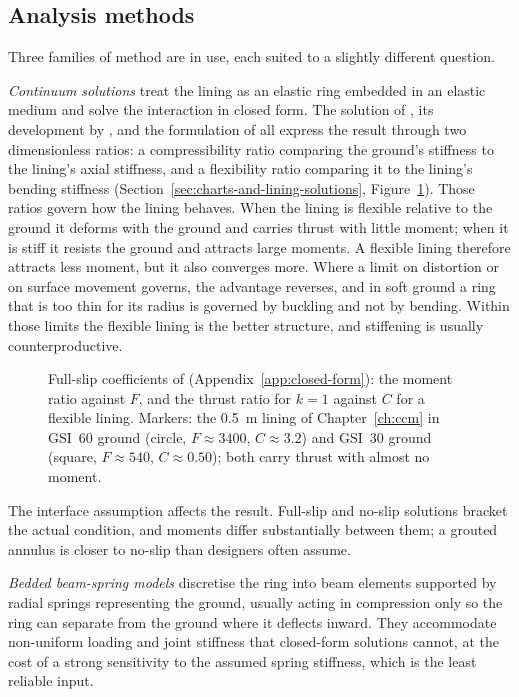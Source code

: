 \subsection{Analysis methods}
\label{sec:lining-analysis}

Three families of method are in use, each suited to a slightly different
question.

\emph{Continuum solutions} treat the lining as an elastic ring embedded in an
elastic medium and solve the interaction in closed form. The solution of \citet{muirwood1975},
its development by \citet{duddeck1985structural}, and the formulation of
\citet{einstein1979simplified}
all express the result through two dimensionless ratios: a
compressibility ratio comparing the ground's stiffness to the lining's axial
stiffness, and a flexibility ratio comparing it to the lining's bending
stiffness (Section~\ref{sec:charts-and-lining-solutions},
Figure~\ref{fig:lining-ratios}). Those ratios govern
how the lining behaves. When the
lining is flexible relative to the ground it deforms with the ground and
carries thrust with little moment; when it is stiff it resists the ground and
attracts large moments. A flexible lining therefore attracts less moment, but
it also converges more. Where a limit on distortion or on surface movement
governs, the advantage reverses, and in soft ground a ring that is too thin
for its radius is governed by buckling and not by bending. Within those
limits the flexible lining is the better structure, and stiffening is
usually counterproductive.

\begin{figure}[htbp]
\centering
{}
\caption{Full-slip coefficients of \citet{einstein1979simplified} (Appendix~\ref{app:closed-form}): the moment ratio against $F$, and the thrust ratio for $k = 1$ against $C$ for a flexible lining. Markers: the 0.5~m lining of Chapter~\ref{ch:ccm} in GSI~60 ground (circle, $F \approx 3400$, $C \approx 3.2$) and GSI~30 ground (square, $F \approx 540$, $C \approx 0.50$); both carry thrust with almost no moment.}
\label{fig:lining-ratios}
\end{figure}

The interface assumption affects the result. Full-slip and no-slip solutions
bracket the actual condition, and moments differ substantially between them; a grouted
annulus is closer to no-slip than designers often assume.

\emph{Bedded beam-spring models} discretise the ring into beam elements
supported by radial springs representing the ground, usually acting in
compression only so the ring can separate from the ground where it deflects
inward. They accommodate non-uniform loading and joint stiffness that
closed-form solutions cannot, at the cost of a strong sensitivity to the
assumed spring stiffness, which is the least reliable input.

